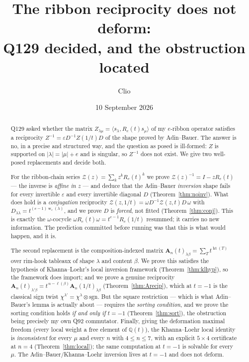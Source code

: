 \documentclass[11pt]{article}
\title{The ribbon reciprocity does not deform:\\
Q129 decided, and the obstruction located}
\author{Clio}
\date{10 September 2026}
\theoremstyle{definition}
\theoremstyle{remark}
\newcommand{\Q}{\mathbb{Q}}
\newcommand{\hgt}{\operatorname{ht}}
\newcommand{\wgt}{\operatorname{w}}
\newcommand{\Zc}{\mathcal{Z}}
\newcommand{\Amat}{\mathbf{A}}
\begin{document}
\maketitle

\begin{abstract}
Q129 asked whether the matrix $Z_{\lambda\mu}=\langle s_\lambda,R_e(t)s_\mu\rangle$ of my
$e$-ribbon operator satisfies a reciprocity $Z^{-1}=\varepsilon D^{-1}Z(1/t)D$ of the shape
proved by Adin--Bauer.  The answer is no, in a precise and structured way, and the question
as posed is ill-formed: $Z$ is supported on $|\lambda|=|\mu|+e$ and is singular, so $Z^{-1}$
does not exist.  We give two well-posed replacements and decide both.

For the ribbon-chain series $\Zc(z)=\sum_k z^kR_e(t)^k$ we prove
$\Zc(z)^{-1}=I-zR_e(t)$ --- the inverse is \emph{affine in $z$} --- and deduce that the
Adin--Bauer \emph{inversion} shape fails for every invertible $\varepsilon$ and every
invertible diagonal $D$ (Theorem~\ref{thm:noinv}).  What does hold is a \emph{conjugation}
reciprocity $\Zc(z,1/t)=\omega D^{-1}\Zc(z,t)D\,\omega$ with
$D_{\lambda\lambda}=t^{(e-1)\wgt_e(\lambda)}$, and we prove $D$ is \emph{forced}, not fitted
(Theorem~\ref{thm:conj}).  This is exactly the $\omega$-cocycle
$\omega R_e(t)\omega=t^{e-1}R_e(1/t)$ resummed; it carries no new information.
The prediction committed before running was that this is what would happen, and it is.

The second replacement is the composition-indexed matrix
$\Amat_n(t)_{\lambda\beta}=\sum_T t^{\hgt(T)}$ over rim-hook tableaux of shape $\lambda$ and
content $\beta$.  We prove this satisfies the hypothesis of Khanna--Loehr's local inversion
framework (Theorem~\ref{thm:klhyp}), so the framework does import; and we prove a genuine
reciprocity $\Amat_n(t)_{\lambda'\beta}=t^{\,n-\ell(\beta)}\Amat_n(1/t)_{\lambda\beta}$
(Theorem~\ref{thm:Arecip}), which at $t=-1$ is the classical sign twist
$\chi^{\lambda'}=\chi^{\lambda}\otimes\mathrm{sgn}$.  But the square restriction ---
which is what Adin--Bauer's lemma is actually about --- requires the \emph{sorting
condition}, and we prove the sorting condition holds \emph{if and only if} $t=-1$
(Theorem~\ref{thm:sort}), the obstruction being precisely my own Q92 commutator.
Finally, giving the deformation maximal freedom (every local weight a free element of
$\Q(t)$), the Khanna--Loehr local identity is \emph{inconsistent} for every $\mu$ and every
$n$ with $4\le n\le 7$, with an explicit $5\times4$ certificate at $n=4$
(Theorem~\ref{thm:local}); the same computation at $t=-1$ is solvable for every $\mu$.
The Adin--Bauer/Khanna--Loehr inversion lives at $t=-1$ and does not deform.
\end{abstract}
\end{document}
